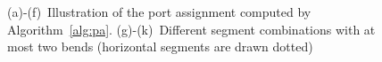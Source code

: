 \documentclass[a4paper,twoside,11pt]{article}
\begin{document}
\begin{figure}[b!]
\begin{minipage}[b]{.18\textwidth}
        \centering
    \end{minipage}  
    \hfill
    \begin{minipage}[b]{.18\textwidth}
        \centering
    \end{minipage}  
    \hfill
    \begin{minipage}[b]{.18\textwidth}
        \centering
    \end{minipage}  
    \hfill
    \begin{minipage}[b]{.18\textwidth}
        \centering
    \end{minipage}
    \caption{
    (a)-(f)~Illustration of the port assignment computed by Algorithm~\ref{alg:pa}.
    (g)-(k)~Different segment combinations with at most two bends (horizontal segments are drawn dotted)}
    \label{fig:6p_ports}
\end{figure} 
\end{document}
